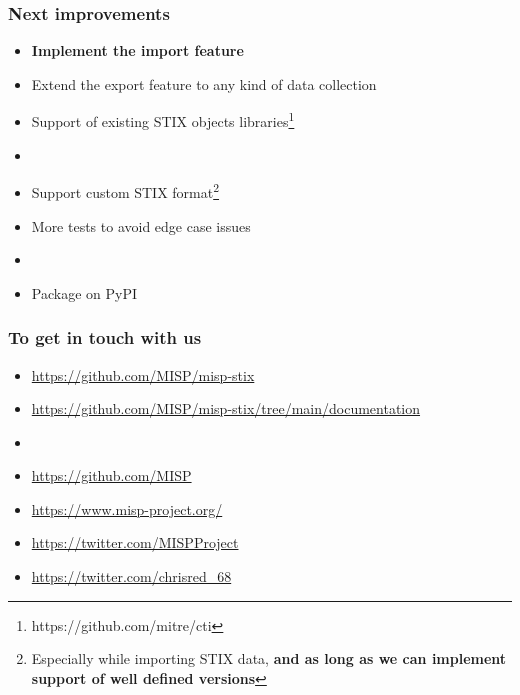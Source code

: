 \begin{frame}
    \frametitle{Next improvements}
    \begin{itemize}
        \item {\bf Implement the import feature}
        \item Extend the export feature to any kind of data collection
        \item Support of existing STIX objects libraries\footnote{https://github.com/mitre/cti}
        \item []
        \item Support custom STIX format\footnote{Especially while importing STIX data, {\bf and as long as we can implement support of well defined versions}}
        \item More tests to avoid edge case issues
        \item []
        \item Package on PyPI
    \end{itemize}
\end{frame}

\begin{frame}
    \frametitle{To get in touch with us}
    \begin{itemize}
        \item \url{https://github.com/MISP/misp-stix}
        \item \url{https://github.com/MISP/misp-stix/tree/main/documentation}
        \item []
        \item \url{https://github.com/MISP}
        \item \url{https://www.misp-project.org/}
        \item \url{https://twitter.com/MISPProject}
        \item \url{https://twitter.com/chrisred_68}
    \end{itemize}
\end{frame}
